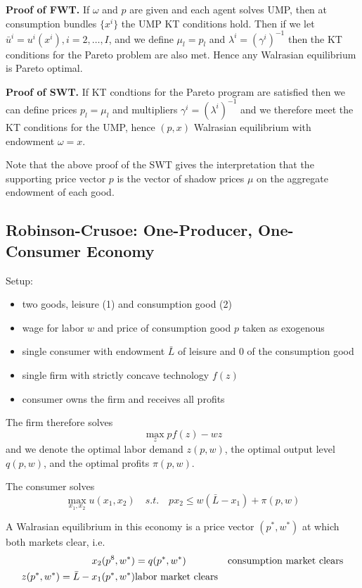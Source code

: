 \textbf{Proof of FWT.} If $\omega$ and $p$ are given and each agent
solves UMP, then at consumption bundles $\{x^i\}$ the UMP KT
conditions hold. Then if we let $\bar u^i = u^i(x^i), i = 2, \dots,
I$, and we define $\mu_l = p_l$ and $\lambda^i = (\gamma^i)^{-1}$ then
the KT conditions for the Pareto problem are also met. Hence any
Walrasian equilibrium is Pareto optimal.

\textbf{Proof of SWT.} If KT condtions for the Pareto program are
satisfied then we can define prices $p_l = \mu_l$ and multipliers
$\gamma^i = (\lambda^i)^{-1}$ and we therefore meet the KT conditions
for the UMP, hence $(p, x)$ Walrasian equilibrium with endowment
$\omega = x$.

Note that the above proof of the SWT gives the interpretation that the
supporting price vector $p$ is the vector of shadow prices $\mu$ on
the aggregate endowment of each good.




\subsection{Robinson-Crusoe: One-Producer, One-Consumer Economy}
\label{sec:robinson-crusoe}

Setup:
\begin{itemize}
\item two goods, leisure (1) and consumption good (2)
\item wage for labor $w$ and price of consumption good $p$ taken as
  exogenous
\item single consumer with endowment $\bar L$ of leisure and $0$ of
  the consumption good
\item single firm with strictly concave technology $f(z)$
\item consumer owns the firm and receives all profits
\end{itemize}

The firm therefore solves
\[
\max_z p f(z) - wz
\]
and we denote the optimal labor demand $z(p, w)$, the optimal output
level $q(p,w)$, and the optimal profits $\pi(p,w)$. 

The consumer solves
\[
\max_{x_1, x_2} u(x_1, x_2) \quad s.t. \quad px_2 \leq w(\bar L - x_1) + \pi(p, w)
\]

A Walrasian equilibrium in this economy is a price vector $(p^*, w^*)$
at which both markets clear, i.e.
\begin{align}
x_2(p^8, w^*) &= q(p^*, w^*) & \text{consumption market clears} \notag \\
z(p^*, w^*) = \bar L - x_1(p^*, w^*) & \text{labor market clears} \notag
\end{align}



